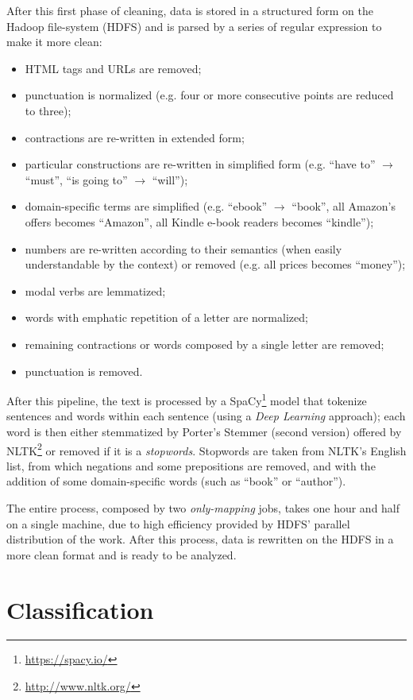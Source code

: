 \documentclass[fleqn,10pt]{SelfArx}
\begin{document}
After this first phase of cleaning, data is stored in a structured form on the Hadoop file-system (HDFS) and is parsed by a series of regular expression to make it more clean:
\begin{itemize}[noitemsep]
    \item HTML tags and URLs are removed;
    \item punctuation is normalized (e.g. four or more consecutive points are reduced to three);
    \item contractions are re-written in extended form;
    \item particular constructions are re-written in simplified form (e.g. ``have to'' $\rightarrow$ ``must'', ``is going to'' $\rightarrow$ ``will'');
    \item domain-specific terms are simplified (e.g. ``ebook'' $\rightarrow$ ``book'', all Amazon's offers becomes ``Amazon'', all Kindle e-book readers becomes ``kindle'');
    \item numbers are re-written according to their semantics (when easily understandable by the context) or removed (e.g. all prices becomes ``money'');
    \item modal verbs are lemmatized;
    \item words with emphatic repetition of a letter are normalized;
    \item remaining contractions or words composed by a single letter are removed;
    \item punctuation is removed.
\end{itemize}
After this pipeline, the text is processed by a SpaCy\footnote{\url{https://spacy.io/}} model that tokenize sentences and words within each sentence (using a \textit{Deep Learning} approach); each word is then either stemmatized by Porter's Stemmer (second version) offered by NLTK\footnote{\url{http://www.nltk.org/}} or removed if it is a \textit{stopwords}.
Stopwords are taken from NLTK's English list, from which negations and some prepositions are removed, and with the addition of some domain-specific words (such as ``book'' or ``author''). \newline

The entire process, composed by two \textit{only-mapping} jobs, takes one hour and half on a single machine, due to high efficiency provided by HDFS' parallel distribution of the work.
After this process, data is rewritten on the HDFS in a more clean format and is ready to be analyzed.

\newpage
\part{Classification}
\end{document}
